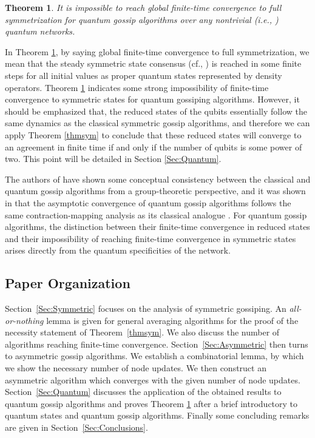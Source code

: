 \documentclass[a4paper, 11pt]{article}
\newtheorem{theorem}{Theorem}
\begin{document}
\medskip

{

\begin{theorem}\label{propquantum}
It is impossible to reach global finite-time convergence to full symmetrization for quantum gossip algorithms over any nontrivial  (i.e., ) quantum networks.
\end{theorem}
}


\medskip

 {
In Theorem \ref{propquantum}, by saying global {finite-time} convergence  to full symmetrization,  we mean that the steady symmetric  state consensus (cf., \cite{Mazzarella2013a}) is reached in some finite steps for all initial values as  proper quantum states represented by density operators. Theorem \ref{propquantum} indicates some strong impossibility of finite-time convergence to symmetric states for quantum gossiping algorithms. However,  it should be emphasized that,  the reduced states of the qubits  essentially follow the same dynamics as the classical symmetric  gossip algorithms, and therefore we can   apply Theorem \ref{thmsym} to conclude that these reduced states will converge to an agreement in finite time if and only if the number of qubits is some power of two. This point will be detailed in Section \ref{Sec:Quantum}.

  The authors of \cite{Mazzarella2013a,Mazzarella2013b} have shown some  conceptual consistency between the classical and quantum gossip algorithms from a group-theoretic perspective, and it was shown in \cite{Mazzarella2013a} that  the asymptotic convergence of quantum gossip algorithms   follows the same contraction-mapping analysis  as its classical analogue \cite{Boyd2006}. For quantum gossip algorithms, the distinction between their  finite-time convergence in reduced states and their  impossibility of reaching finite-time convergence in symmetric states  arises directly from the quantum specificities of the network.  }



\subsection{Paper Organization}
 Section~\ref{Sec:Symmetric} focuses on the analysis of symmetric gossiping. An {\em all-or-nothing} lemma is given  for general averaging algorithms for the proof of the necessity statement of Theorem~\ref{thmsym}. We also discuss the number of algorithms  reaching finite-time convergence. Section~\ref{Sec:Asymmetric} then turns to asymmetric gossip algorithms. We establish a combinatorial lemma, by which we show the necessary number of node updates. We then construct an asymmetric algorithm which converges with the given number of node updates. Section~\ref{Sec:Quantum} discusses the application of the obtained results to  quantum gossip algorithms and proves Theorem \ref{propquantum} after a brief introductory to quantum states and quantum gossip algorithms.   Finally some concluding remarks are given in Section~\ref{Sec:Conclusions}.
\end{document}
